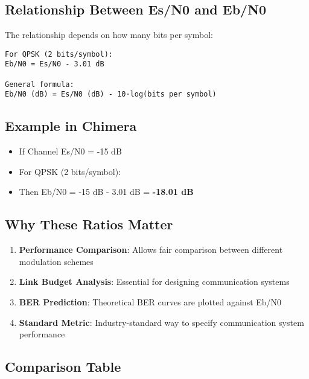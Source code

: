 \subsection{Relationship Between Es/N0 and
Eb/N0}\label{relationship-between-esn0-and-ebn0}

The relationship depends on how many bits per symbol:

\begin{verbatim}
For QPSK (2 bits/symbol):
Eb/N0 = Es/N0 - 3.01 dB

General formula:
Eb/N0 (dB) = Es/N0 (dB) - 10·log(bits per symbol)
\end{verbatim}

\subsection{Example in Chimera}\label{example-in-chimera}

\begin{itemize}
\tightlist
\item
  If Channel Es/N0 = -15 dB
\item
  For QPSK (2 bits/symbol):
\item
  Then Eb/N0 = -15 dB - 3.01 dB = \textbf{-18.01 dB}
\end{itemize}

\subsection{Why These Ratios Matter}\label{why-these-ratios-matter}

\begin{enumerate}
\def\labelenumi{\arabic{enumi}.}
\tightlist
\item
  \textbf{Performance Comparison}: Allows fair comparison between
  different modulation schemes
\item
  \textbf{Link Budget Analysis}: Essential for designing communication
  systems
\item
  \textbf{BER Prediction}: Theoretical BER curves are plotted against
  Eb/N0
\item
  \textbf{Standard Metric}: Industry-standard way to specify
  communication system performance
\end{enumerate}

\subsection{Comparison Table}\label{comparison-table}

